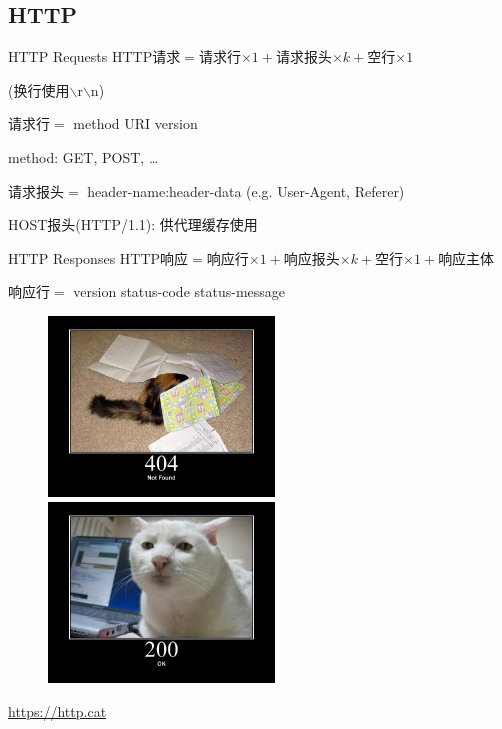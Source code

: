 \documentclass[]{beamer}
\begin{document}
\subsection{HTTP}

\begin{frame}{HTTP Requests}
	HTTP请求$=$请求行$\times 1+$请求报头$\times k+$空行$\times 1$ 
	
	(换行使用$\backslash$r$\backslash$n)
	
	请求行$=$ method URI version
	
	method: GET, POST, \ldots
	
	请求报头$=$ header-name:header-data (e.g. User-Agent, Referer)
	
	HOST报头(HTTP/1.1): 供代理缓存使用
\end{frame}

\begin{frame}{HTTP Responses}
	HTTP响应$=$响应行$\times 1+$响应报头$\times k+$空行$\times 1+$响应主体
	
	响应行$=$ version status-code status-message

	\begin{figure}[htbp]
	\centering
	\begin{minipage}[t]{0.48\textwidth}
	\centering
	\includegraphics[width=6cm]{figures/404}
	\end{minipage}
	\begin{minipage}[t]{0.48\textwidth}
	\centering
	\includegraphics[width=6cm]{figures/200}
	\end{minipage}
	\end{figure}
	
	\url{https://http.cat}

\end{frame}
\end{document}
